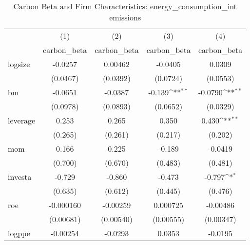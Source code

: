 \begin{table}[htbp]\centering
\def\sym#1{\ifmmode^{#1}\else\(^{#1}\)\fi}
\caption{Carbon Beta and Firm Characteristics: energy\_consumption\_int emissions}
\begin{tabular}{l*{4}{c}}
\hline\hline
                    &\multicolumn{1}{c}{(1)}&\multicolumn{1}{c}{(2)}&\multicolumn{1}{c}{(3)}&\multicolumn{1}{c}{(4)}\\
                    &\multicolumn{1}{c}{carbon\_beta}&\multicolumn{1}{c}{carbon\_beta}&\multicolumn{1}{c}{carbon\_beta}&\multicolumn{1}{c}{carbon\_beta}\\
\hline
logsize             &     -0.0257         &     0.00462         &     -0.0405         &      0.0309         \\
                    &    (0.0467)         &    (0.0392)         &    (0.0724)         &    (0.0553)         \\
[1em]
bm                  &     -0.0651         &     -0.0387         &      -0.139\sym{**} &     -0.0790\sym{**} \\
                    &    (0.0978)         &    (0.0893)         &    (0.0652)         &    (0.0329)         \\
[1em]
leverage            &       0.253         &       0.265         &       0.350         &       0.430\sym{**} \\
                    &     (0.265)         &     (0.261)         &     (0.217)         &     (0.202)         \\
[1em]
mom                 &       0.166         &       0.225         &      -0.189         &     -0.0419         \\
                    &     (0.700)         &     (0.670)         &     (0.483)         &     (0.481)         \\
[1em]
investa             &      -0.729         &      -0.860         &      -0.473         &      -0.797\sym{*}  \\
                    &     (0.635)         &     (0.612)         &     (0.445)         &     (0.476)         \\
[1em]
roe                 &   -0.000160         &    -0.00259         &    0.000725         &    -0.00486         \\
                    &   (0.00681)         &   (0.00540)         &   (0.00555)         &   (0.00347)         \\
[1em]
logppe              &    -0.00254         &     -0.0293         &      0.0353         &     -0.0195         \\

\end{tabular}
\end{table}
